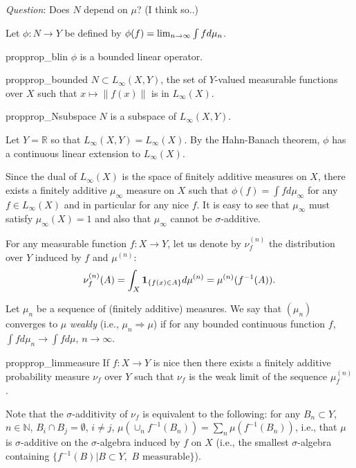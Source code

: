 \documentclass[12pt]{article}
\newcommand{\todoc}[2][]{\todo[color=Apricot,#1]{#2}}
\newcommand{\ra}{\rightarrow}
\newcommand{\real}{\mathbb{R}}
\newcommand{\one}[1]{\mathbf{1}_{\{#1\}}}
\renewcommand{\natural}{\mathbb{N}}
\begin{document}
\noindent \emph{Question}: Does $N$ depend on $\mu$? (I think so..)

Let $\phi:N \ra Y$ be defined by $\phi(f) = \lim_{n\ra\infty} \int f \dmu_n$.
\begin{restatable}{prop}{prop_blin}
$\phi$ is a bounded linear operator.
\end{restatable}

\begin{restatable}{prop}{prop_bounded}
$N \subset L_{\infty}(X,Y)$, the set of $Y$-valued  measurable functions over $X$ such that $x\mapsto \| f(x)\|$ is in $L_{\infty}(X)$.
\end{restatable}

\begin{restatable}{prop}{prop_Nsubspace}
$N$ is a subspace of $L_{\infty}(X,Y)$.
\end{restatable}

Let $Y = \real$ so that $L_\infty(X,Y) = L_\infty(X)$.
By the Hahn-Banach theorem, $\phi$ has a continuous linear extension to $L_{\infty}(X)$. \todoc{Generalization for  $L_{\infty}(X,Y)$}

Since the dual of $L_{\infty}(X)$ is the space of finitely additive measures on $X$, there exists a finitely additive $\mu_\infty$ measure on $X$ such that $\phi(f) = \int f d\mu_{\infty}$ for any $f\in L_{\infty}(X)$ and in particular for any nice $f$.
It is easy to see that $\mu_\infty$ must satisfy $\mu_{\infty}(X) = 1$ and also that $\mu_\infty$ cannot be $\sigma$-additive.

For any measurable function $f:X \ra Y$, let us denote
by $\nu^{(n)}_f$ the distribution over $Y$ induced by $f$ and $\mu^{(n)}$:
\[
\nu^{(n)}_f(A) = \int_X \one{f(x)\in A} \dmu^{(n)} = \mu^{(n)}( f^{-1}(A) ).
\]

Let $\mu_n$ be a sequence of (finitely additive) measures.
We say that $(\mu_n)$ converges to $\mu$ \emph{weakly} (i.e., $\mu_n \Rightarrow \mu$) if for any bounded continuous function $f$, $\int f d\mu_n \ra \int f d\mu$, $n\ra\infty$.

\begin{restatable}{prop}{prop_limmeasure}
If $f:X\ra Y$ is nice then there exists a finitely additive probability measure $\nu_f$ over $Y$ such that $\nu_f$ is the weak limit of the sequence $\mu^{(n)}_f$.
\end{restatable}

Note that the $\sigma$-additivity of $\nu_f$ is equivalent to the following: for any $B_n\subset Y$, $n\in \natural$, $B_i \cap B_j = \emptyset$, $i\ne j$, $\mu(\cup_n f^{-1}(B_n) ) = \sum_n \mu(f^{-1}(B_n))$, i.e., that $\mu$ is $\sigma$-additive on the $\sigma$-algebra induced by $f$ on $X$ (i.e., the smallest $\sigma$-algebra containing $\{f^{-1}(B)| B \subset Y, \,\, B \text{ measurable}\}$).
\end{document}
